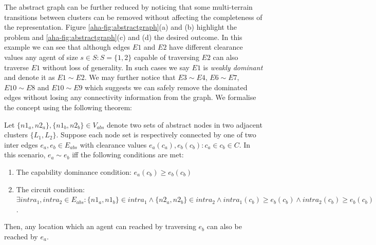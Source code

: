The abstract graph can be further reduced by noticing that some multi-terrain transitions between clusters can be removed without affecting the completeness of the representation. 
Figure \ref{aha-fig:abstractgraph}(a) and (b) highlight the problem and \ref{aha-fig:abstractgraph}(c) and (d) the desired outcome.
In this example we can see that although edges $E1$ and $E2$ have different clearance values any agent of size $s \in S : S = \lbrace 1, 2 \rbrace$ capable of traversing $E2$ can also traverse $E1$ without loss of generality. 
In such cases we say $E1$ is \emph{weakly dominant} and denote it as $E1 \sim E2$. 
We may further notice that $E3 \sim E4$, $E6 \sim E7$, $E10 \sim E8$ and $E10 \sim E9$ which suggests we can safely remove the dominated edges without losing any connectivity information from the graph. 
We formalise the concept using the following theorem:
\begin{theorem}
\label{aha-theorem:weakdominance}
Let $\lbrace n1_{a}, n2_{a} \rbrace, \lbrace n1_{b}, n2_{b} \rbrace \in V_{abs}$ denote two sets of abstract nodes in two adjacent clusters $\lbrace L_{1}, L_{2} \rbrace$. Suppose each node set is respectively connected by one of two inter edges $e_{a}, e_{b} \in E_{abs}$ with clearance values $e_{a}(c_{a}), e_{b}(c_{b})  : c_{a} \in c_{b} \in C$.
 In this scenario, $e_{a} \sim e_{b}$ iff the following conditions are met:
\begin{enumerate}
\item{The capability dominance condition: $e_{a}(c_{b}) \geq e_{b}(c_{b})$}
\item{The circuit condition: $\exists intra_{1}, intra_{2} \in E_{abs} : \lbrace n1_{a}, n1_{b} \rbrace \in intra_{1} \wedge \lbrace n2_{a}, n2_{b} \rbrace \in intra_{2} \wedge intra_{1}(c_{b}) \geq e_{b}(c_{b}) \wedge intra_{2}(c_{b}) \geq e_{b}(c_{b})$.}
\end{enumerate}
Then, any location which an agent can reached by traversing $e_{b}$ can also be reached by $e_{a}$.
\end{theorem}

